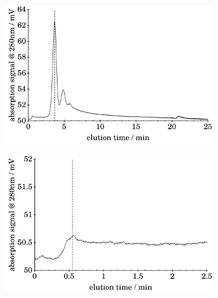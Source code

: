 \begin{figure}[H]
\begin{center}
\begin{subfigure}{\subFigSize}
  \end{subfigure}
  \\\vspace*{.5em}
      \begin{subfigure}{\subFigSize}
    \includegraphics[width=\linewidth]{./images/data/rawPlots/img_BSA_VC_2_5_r2_te.pdf}
    \label{subfig:raw_BSA2_5_r2_te}
  \end{subfigure}
  \begin{subfigure}{\subFigSize}
    \includegraphics[width=\linewidth]{./images/data/rawPlots/img_BSA_VC_2_5_r2_t0.pdf}
  \end{subfigure}

\end{center}
\end{figure}
